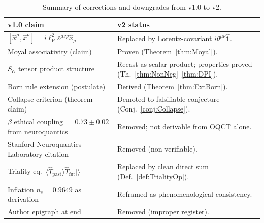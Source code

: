 \documentclass[11pt,a4paper]{article}
\theoremstyle{myrmk}
\newcommand{\lP}{\ell_{\mathrm{P}}}
\newcommand{\Identity}{\hat{\mathbf{1}}}
\begin{document}
\begin{table}[H]
\centering\small
\renewcommand{\arraystretch}{1.18}
\begin{tabular}{p{6.6cm}p{8.0cm}}
\toprule
\textbf{v1.0 claim} & \textbf{v2 status} \\ \midrule
$[\hat x^\mu,\hat x^\nu]=i\lP^2\varepsilon^{\mu\nu\rho}\hat x_\rho$
   & Replaced by Lorentz-covariant $i\theta^{\mu\nu}\Identity$. \\
Moyal associativity (claim)
   & Proven (Theorem~\ref{thm:Moyal}). \\
$S_{\mathcal{O}}$ tensor product structure
   & Recast as scalar product; properties proved (Th.~\ref{thm:NonNeg}--\ref{thm:DPI}). \\
Born rule extension (postulate)
   & Derived (Theorem~\ref{thm:ExtBorn}). \\
Collapse criterion (theorem-claim)
   & Demoted to falsifiable conjecture (Conj.~\ref{conj:Collapse}). \\
$\beta$ ethical coupling $=0.73\pm 0.02$ from neuroquantics
   & Removed; not derivable from OQCT alone. \\
Stanford Neuroquantics Laboratory citation
   & Removed (non-verifiable). \\
Triality eq.\ $\langle\hat T_{\mathrm{past}}\rangle\hat T_{\mathrm{fut}}|\rangle$
   & Replaced by clean direct sum (Def.~\ref{def:TrialityOp}). \\
Inflation $n_s=0.9649$ as derivation
   & Reframed as phenomenological consistency. \\
Author epigraph at end
   & Removed (improper register). \\
\bottomrule
\end{tabular}
\caption{Summary of corrections and downgrades from v1.0 to v2.}
\end{table}
\end{document}
